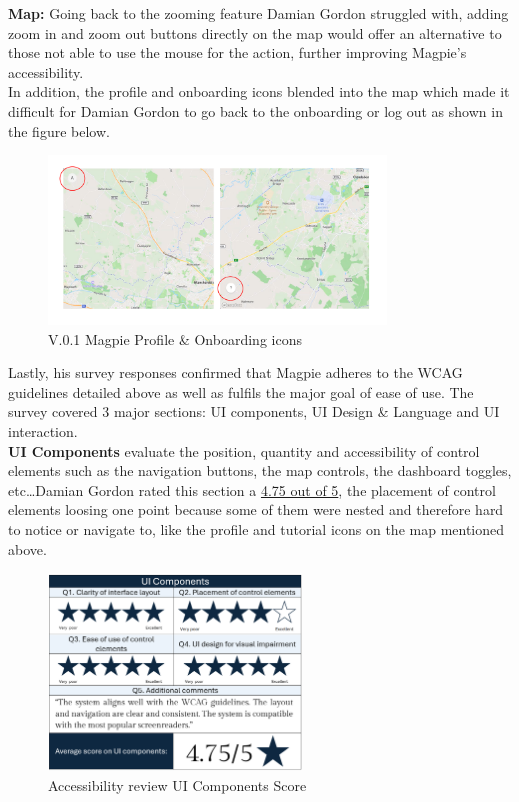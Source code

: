 \newpage
\noindent\textbf{Map: }
Going back to the zooming feature Damian Gordon struggled with, adding zoom in and zoom out buttons directly on the map would offer an alternative to those not able to use the mouse for the action, further improving Magpie's accessibility.\\In addition, the profile and onboarding icons blended into the map which made it difficult for Damian Gordon to go back to the onboarding or log out as shown in the figure below.
\begin{figure}[h!]
    \centering
    \includegraphics[width=0.8\textwidth]{images/old-icons-map.png}
    \caption{V.0.1 Magpie Profile \& Onboarding icons}
\end{figure}

\noindent Lastly, his survey responses confirmed that Magpie adheres to the WCAG guidelines detailed above as well as fulfils the major goal of ease of use. The survey covered 3 major sections: UI components, UI Design \& Language and UI interaction.\\

\noindent\textbf{UI Components} evaluate the position, quantity and accessibility of control elements such as the navigation buttons, the map controls, the dashboard toggles, etc\ldots Damian Gordon rated this section a \underline{4.75 out of 5}, the placement of control elements loosing one point because some of them were nested and therefore hard to notice or navigate to, like the profile and tutorial icons on the map mentioned above.
\begin{figure}[h!]
    \centering
    \includegraphics[width=0.6\textwidth]{images/accessb-survey-components.png}
    \caption{Accessibility review \- UI Components Score}
\end{figure}

